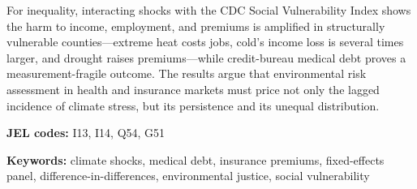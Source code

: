 \documentclass[11pt]{article}
\begin{document}
For inequality, interacting shocks with the CDC Social Vulnerability Index shows the harm to
income, employment, and premiums is amplified in structurally vulnerable counties---extreme
heat costs jobs, cold's income loss is several times larger, and drought raises
premiums---while credit-bureau medical debt proves a measurement-fragile outcome. The
results argue that environmental risk assessment in health and insurance markets must price
not only the lagged incidence of climate stress, but its persistence and its unequal
distribution.

\vspace{1.0em}

\noindent\textbf{JEL codes:} I13, I14, Q54, G51

\smallskip
\noindent\textbf{Keywords:} climate shocks, medical debt, insurance premiums, fixed-effects
panel, difference-in-differences, environmental justice, social vulnerability
\end{document}
